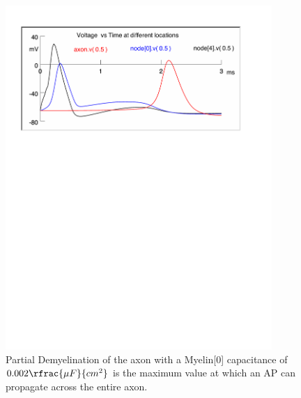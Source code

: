 \documentclass[12pt]{article}
\begin{document}

\begin{figure}[H]
\centering
\includegraphics[width=0.9\textwidth]{Results/4d-002}
\caption{\label{fig:P4d1} Partial Demyelination of the axon with a Myelin[0] capacitance of $0.002 \rfrac{\mu F}{cm^{2}}$ is the maximum value at which an AP can propagate across the entire axon.}
\end{figure}
\end{document}

